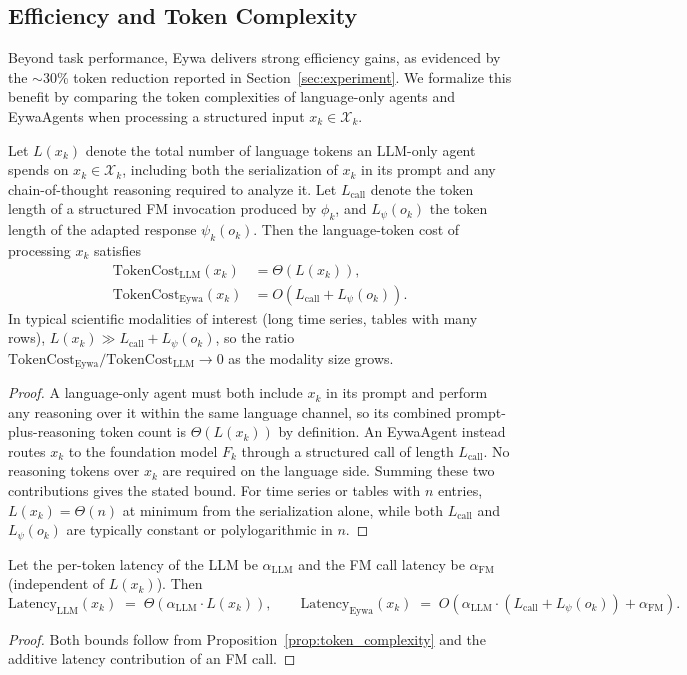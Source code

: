 \documentclass{llmxive}
\begin{document}
{\subsection{Efficiency and Token Complexity}
\label{app:efficiency}

Beyond task performance, Eywa delivers strong efficiency gains, as evidenced by the $\sim$30\% token reduction reported in Section~\ref{sec:experiment}. We formalize this benefit by comparing the token complexities of language-only agents and EywaAgents when processing a structured input $x_k\in\mathcal{X}_k$.

\begin{proposition}
\label{prop:token_complexity}
Let $L(x_k)$ denote the total number of language tokens an LLM-only agent spends on $x_k\in\mathcal{X}_k$, including both the serialization of $x_k$ in its prompt and any chain-of-thought reasoning required to analyze it. Let $L_{\mathrm{call}}$ denote the token length of a structured FM invocation produced by $\phi_k$, and $L_{\psi}(o_k)$ the token length of the adapted response $\psi_k(o_k)$. Then the language-token cost of processing $x_k$ satisfies
\begin{align}
\mathrm{TokenCost}_{\mathrm{LLM}}(x_k) &= \Theta(L(x_k)), \\
\mathrm{TokenCost}_{\mathrm{Eywa}}(x_k) &= O(L_{\mathrm{call}}+L_{\psi}(o_k)).
\end{align}
In typical scientific modalities of interest (long time series, tables with many rows), $L(x_k)\gg L_{\mathrm{call}}+L_{\psi}(o_k)$, so the ratio $\mathrm{TokenCost}_{\mathrm{Eywa}}/\mathrm{TokenCost}_{\mathrm{LLM}}\to 0$ as the modality size grows.
\end{proposition}
\begin{proof}
A language-only agent must both include $x_k$ in its prompt and perform any reasoning over it within the same language channel, so its combined prompt-plus-reasoning token count is $\Theta(L(x_k))$ by definition. An EywaAgent instead routes $x_k$ to the foundation model $F_k$ through a structured call of length $L_{\mathrm{call}}$. No reasoning tokens over $x_k$ are required on the language side. Summing these two contributions gives the stated bound. For time series or tables with $n$ entries, $L(x_k)=\Theta(n)$ at minimum from the serialization alone, while both $L_{\mathrm{call}}$ and $L_{\psi}(o_k)$ are typically constant or polylogarithmic in $n$.
\end{proof}

\begin{proposition}
\label{prop:latency}
Let the per-token latency of the LLM be $\alpha_{\mathrm{LLM}}$ and the FM call latency be $\alpha_{\mathrm{FM}}$ (independent of $L(x_k)$). Then
\[
\mathrm{Latency}_{\mathrm{LLM}}(x_k)\;=\;\Theta(\alpha_{\mathrm{LLM}}\cdot L(x_k)),
\qquad
\mathrm{Latency}_{\mathrm{Eywa}}(x_k)\;=\;O(\alpha_{\mathrm{LLM}}\cdot(L_{\mathrm{call}}+L_{\psi}(o_k))+\alpha_{\mathrm{FM}}).
\]
\end{proposition}
\begin{proof}
Both bounds follow from Proposition~\ref{prop:token_complexity} and the additive latency contribution of an FM call.
\end{proof}

}
\end{document}
